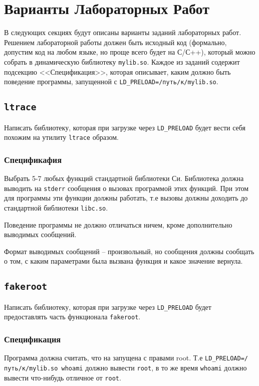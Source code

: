 \documentclass[a4paper,titlepage]{article}
\begin{document}
\section{Варианты Лабораторных Работ}

В следующих секциях будут описаны варианты заданий лабораторных работ. Решением
лабораторной работы должен быть исходный код (формально, допустим код на любом
языке, но проще всего будет на С/С++), который можно собрать в динамическую
библиотеку \texttt{mylib.so}. Каждое из заданий содержит подсекцию
<<Спецификация>>, которая описывает, каким должно быть поведение программы,
запущенной с \texttt{LD\_PRELOAD=/путь/к/mylib.so}.

\subsection{\texttt{ltrace}}

Написать библиотеку, которая при загрузке через \texttt{LD\_PRELOAD} будет вести
себя похожим на утилиту \texttt{ltrace} образом.

\subsubsection{Спецификафия}
Выбрать 5-7 любых функций стандартной библиотеки Си. Библиотека должна выводить
на \texttt{stderr} сообщения о вызовах программой этих функций. При этом для
программы эти функции должны работать, т.е вызовы должны доходить до стандартной
библиотеки \texttt{libc.so}.

Поведение программы не должно отличаться ничем, кроме дополнительно выводимых сообщений.

Формат выводимых сообщений -- произвольный, но сообщения должны сообщать о том,
с каким параметрами была вызвана функция и какое значение вернула.

\subsection{\texttt{fakeroot}}

Написать библиотеку, которая при загрузке через \texttt{LD\_PRELOAD} будет
предоставлять часть функционала \texttt{fakeroot}.

\subsubsection{Спецификация}

Программа должна считать, что на запущена с правами root. Т.е
\texttt{LD\_PRELOAD=/путь/к/mylib.so whoami} должно вывести \texttt{root}, в то
же время \texttt{whoami} должно вывести что-нибудь отличное от \texttt{root}.
\end{document}
